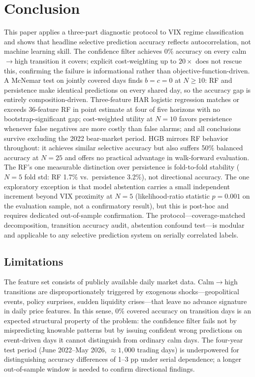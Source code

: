 \documentclass[12pt]{article}
\begin{document}
\section{Conclusion}
\label{sec:conclusion}

This paper applies a three-part diagnostic protocol to VIX regime classification and shows that headline selective prediction accuracy reflects autocorrelation, not machine learning skill. The confidence filter achieves 0\% accuracy on every calm$\to$high transition it covers; explicit cost-weighting up to $20{\times}$ does not rescue this, confirming the failure is informational rather than objective-function-driven. A McNemar test on jointly covered days finds $b = c = 0$ at $N \geq 10$: RF and persistence make identical predictions on every shared day, so the accuracy gap is entirely composition-driven. Three-feature HAR logistic regression matches or exceeds 36-feature RF in point estimate at four of five horizons with no bootstrap-significant gap; cost-weighted utility at $N = 10$ favors persistence whenever false negatives are more costly than false alarms; and all conclusions survive excluding the 2022 bear-market period. HGB mirrors RF behavior throughout: it achieves similar selective accuracy but also suffers 50\% balanced accuracy at $N = 25$ and offers no practical advantage in walk-forward evaluation. The RF's one measurable distinction over persistence is fold-to-fold stability ($N = 5$ fold std: RF 1.7\% vs.\ persistence 3.2\%), not directional accuracy. The one exploratory exception is that model abstention carries a small independent increment beyond VIX proximity at $N = 5$ (likelihood-ratio statistic $p = 0.001$ on the evaluation sample, not a confirmatory result), but this is post-hoc and requires dedicated out-of-sample confirmation. The protocol---coverage-matched decomposition, transition accuracy audit, abstention confound test---is modular and applicable to any selective prediction system on serially correlated labels.

\subsection*{Limitations}

The feature set consists of publicly available daily market data. Calm$\to$high transitions are disproportionately triggered by exogenous shocks---geopolitical events, policy surprises, sudden liquidity crises---that leave no advance signature in daily price features. In this sense, 0\% covered accuracy on transition days is an expected structural property of the problem: the confidence filter fails not by mispredicting knowable patterns but by issuing confident wrong predictions on event-driven days it cannot distinguish from ordinary calm days. The four-year test period (June 2022--May 2026, ${\approx}1{,}000$ trading days) is underpowered for distinguishing accuracy differences of 1--3 pp under serial dependence; a longer out-of-sample window is needed to confirm directional findings.
\end{document}
